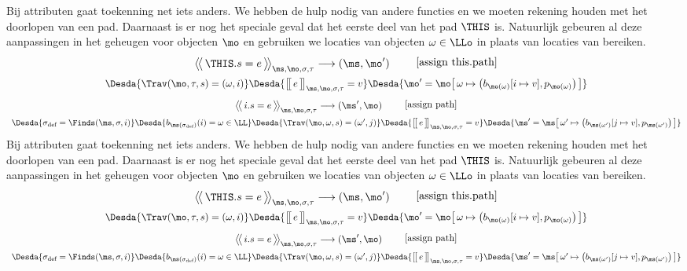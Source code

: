 Bij attributen gaat toekenning net iets anders. We hebben de hulp nodig van andere functies en we moeten rekening houden met het doorlopen van een pad. Daarnaast is er nog het speciale geval dat het eerste deel van het pad $\THIS$ is. Natuurlijk gebeuren al deze aanpassingen in het geheugen voor objecten $\mo$ en gebruiken we locaties van objecten $\omega\in\LLo$ in plaats van locaties van bereiken.
%
\begin{gather*}
  \AxiomC{$
    \Config{\THIS.s = e}{\ms, \mo, \sigma, \tau}
    \longrightarrow
    (\ms, \mo')
  $}
  {\DisplayProof}
  \tag*{[assign this.path]} \\
  \Desdas{
    \Desda{\Trav(\mo, \tau, s) = (\omega, i)}
    \Desda{\Surr{e}_{\ms, \mo, \sigma, \tau} = v}
    \Desda{\mo'= \mo \surr{ \omega \mapsto \big(b_{\mo(\omega)}[ i \mapsto v ], p_{\mo(\omega)}\big) }}
  }
\end{gather*}
%
\begin{gather*}
  \AxiomC{$
    \Config{i.s = e}{\ms, \mo, \sigma, \tau}
    \longrightarrow
    (\ms', \mo)
  $}
  {\DisplayProof}
  \tag*{[assign path]} \\
  \Desdas{
    \Desda{\sigma_\text{def} = \Finds(\ms, \sigma, i)}
    \Desda{b_{\ms(\sigma_\text{def})}(i) = \omega \in \LL}
    \Desda{\Trav(\mo, \omega, s) = (\omega', j)}
    \Desda{\Surr{e}_{\ms, \mo, \sigma, \tau} = v}
    \Desda{\ms'= \ms \surr{ \omega' \mapsto \big(b_{\ms(\omega')}[ j \mapsto v ], p_{\ms(\omega')}\big) }}
  }
\end{gather*}
%
Bij attributen gaat toekenning net iets anders. We hebben de hulp nodig van andere functies en we moeten rekening houden met het doorlopen van een pad. Daarnaast is er nog het speciale geval dat het eerste deel van het pad $\THIS$ is. Natuurlijk gebeuren al deze aanpassingen in het geheugen voor objecten $\mo$ en gebruiken we locaties van objecten $\omega\in\LLo$ in plaats van locaties van bereiken.
%
\begin{gather*}
  \AxiomC{$
    \Config{\THIS.s = e}{\ms, \mo, \sigma, \tau}
    \longrightarrow
    (\ms, \mo')
  $}
  {\DisplayProof}
  \tag*{[assign this.path]} \\
  \Desdas{
    \Desda{\Trav(\mo, \tau, s) = (\omega, i)}
    \Desda{\Surr{e}_{\ms, \mo, \sigma, \tau} = v}
    \Desda{\mo'= \mo \surr{ \omega \mapsto \big(b_{\mo(\omega)}[ i \mapsto v ], p_{\mo(\omega)}\big) }}
  }
\end{gather*}
%
\begin{gather*}
  \AxiomC{$
    \Config{i.s = e}{\ms, \mo, \sigma, \tau}
    \longrightarrow
    (\ms', \mo)
  $}
  {\DisplayProof}
  \tag*{[assign path]} \\
  \Desdas{
    \Desda{\sigma_\text{def} = \Finds(\ms, \sigma, i)}
    \Desda{b_{\ms(\sigma_\text{def})}(i) = \omega \in \LL}
    \Desda{\Trav(\mo, \omega, s) = (\omega', j)}
    \Desda{\Surr{e}_{\ms, \mo, \sigma, \tau} = v}
    \Desda{\ms'= \ms \surr{ \omega' \mapsto \big(b_{\ms(\omega')}[ j \mapsto v ], p_{\ms(\omega')}\big) }}
  }
\end{gather*}
